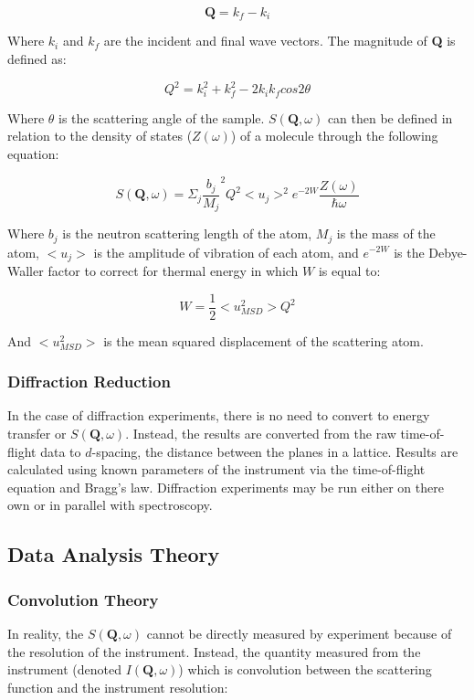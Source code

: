 \documentclass[paper=a4, fontsize=11pt]{scrartcl}	%
\numberwithin{equation}{section}															%
\numberwithin{figure}{section}																%
\numberwithin{table}{section}																%
\begin{document}
\begin{equation}
\mathbf{Q} = k_f - k_i
\end{equation}

Where $k_i$ and $k_f$ are the incident and final wave vectors. The magnitude of \textbf{Q} is defined as:

\begin{equation}
Q^2 = k_i^2 + k_f^2 - 2k_ik_fcos 2\theta
\end{equation}

Where $\theta$ is the scattering angle of the sample. $S(\mathbf{Q}, \omega)$ can then be defined in relation to the density of states ($Z(\omega)$) of a molecule through the following equation:

\begin{equation}
S(\mathbf{Q}, \omega) = \Sigma_j \frac{b_j}{M_j}^2Q^2 < u_j >^2 e^{-2W}\frac{Z(\omega)}{\hbar\omega}
\end{equation}

Where $b_j$ is the neutron scattering length of the atom, $M_j$ is the mass of the atom, $< u_j >$ is the amplitude of vibration of each atom, and $e^{-2W}$ is the Debye-Waller factor \cite{smukhopadhyay2014}  to correct for thermal energy in which $W$ is equal to:

\begin{equation}
W = \frac{1}{2} < u^2_{MSD} > Q^2
\end{equation}

And $< u^2_{MSD} >$ is the mean squared displacement of the scattering atom.

\subsubsection{Diffraction Reduction}
In the case of diffraction experiments, there is no need to convert to energy transfer or $S(\mathbf{Q}, \omega)$. Instead, the results are converted from the raw time-of-flight data to $d$-spacing, the distance between the planes in a lattice. Results are calculated using known parameters of the instrument via the time-of-flight equation and Bragg's law. Diffraction experiments may be run either on there own or in parallel with spectroscopy.

\subsection{Data Analysis Theory}

\subsubsection{Convolution Theory}
In reality, the $S(\mathbf{Q}, \omega)$ cannot be directly measured by experiment because of the resolution of the instrument. Instead, the quantity measured from the instrument (denoted $I(\mathbf{Q}, \omega)$) which is convolution between the scattering function and the instrument resolution:
\end{document}
